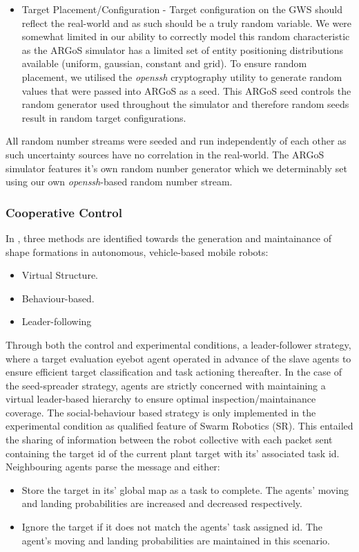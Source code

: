\documentclass{report}
\begin{document}
\begin{itemize}
	\item Target Placement/Configuration - Target configuration on the GWS should reflect the real-world and as such should be a truly random variable. We were somewhat limited in our ability to correctly model this random characteristic as the ARGoS simulator has a limited set of entity positioning distributions available (uniform, gaussian, constant and grid). To ensure random placement, we utilised the \textit{openssh} cryptography utility to generate random values that were passed into ARGoS as a seed. This ARGoS seed controls the random generator used throughout the simulator and therefore random seeds result in random target configurations.
\end{itemize}

All random number streams were seeded and run independently of each other as such uncertainty sources have no correlation in the real-world. The ARGoS simulator features it's own random number generator which we determinably set using our own \textit{openssh}-based random number stream.

\subsubsection{Cooperative Control}
In \cite{Macas2009}, three methods are identified towards the generation and maintainance of shape formations in autonomous, vehicle-based mobile robots:
\begin{itemize}
	\item Virtual Structure.
	\item Behaviour-based.
	\item Leader-following
\end{itemize}
Through both the control and experimental conditions, a leader-follower strategy, where a target evaluation eyebot agent operated in advance of the slave agents to ensure efficient target classification and task actioning thereafter. In the case of the seed-spreader strategy, agents are strictly concerned with maintaining a virtual leader-based hierarchy to ensure optimal inspection/maintainance coverage. The social-behaviour based strategy is only implemented in the experimental condition as qualified feature of Swarm Robotics (SR). This entailed the sharing of information between the robot collective with each packet sent containing the target id of the current plant target with its' associated task id. Neighbouring agents parse the message and either:

\begin{itemize}
	\item Store the target in its' global map as a task to complete. The agents' moving and landing probabilities are increased and decreased respectively.
	\item Ignore the target if it does not match the agents' task assigned id. The agent's moving and landing probabilities are maintained in this scenario.
\end{itemize}
\end{document}
